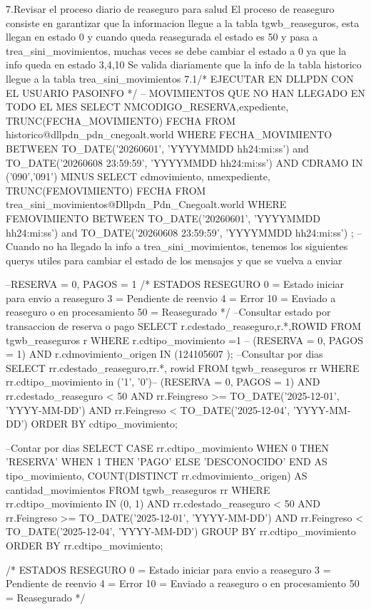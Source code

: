 7.Revisar el proceso diario de reaseguro para salud
El proceso de reaseguro consiste en garantizar que la informacion llegue a la tabla tgwb_reaseguros, esta llegan en estado 0 y cuando queda reasegurada el estado es 50 y pasa a trea_sini_movimientos, muchas veces se debe cambiar el estado a 0 ya que la info queda en estado 3,4,10
Se valida diariamente que la info de la tabla historico llegue a la tabla trea_sini_movimientos
7.1/* EJECUTAR EN DLLPDN CON EL USUARIO PASOINFO */
-- MOVIMIENTOS QUE NO HAN LLEGADO EN TODO EL MES
SELECT NMCODIGO_RESERVA,expediente, TRUNC(FECHA_MOVIMIENTO) FECHA
  FROM historico@dllpdn_pdn_cnegoalt.world
 WHERE FECHA_MOVIMIENTO  BETWEEN TO_DATE('20260601', 'YYYYMMDD hh24:mi:ss') and TO_DATE('20260608 23:59:59', 'YYYYMMDD hh24:mi:ss')
 AND CDRAMO IN ('090','091')
 MINUS 
SELECT cdmovimiento, nmexpediente, TRUNC(FEMOVIMIENTO) FECHA
  FROM trea_sini_movimientos@Dllpdn_Pdn_Cnegoalt.world
 WHERE FEMOVIMIENTO  BETWEEN TO_DATE('20260601', 'YYYYMMDD hh24:mi:ss') and TO_DATE('20260608 23:59:59', 'YYYYMMDD hh24:mi:ss')
;
--Cuando no ha llegado la info a trea_sini_movimientos, tenemos los siguientes querys utiles para cambiar el estado de los mensajes y que se vuelva a enviar 

--RESERVA = 0, PAGOS = 1
/*
ESTADOS RESEGURO
0 = Estado iniciar para envio a reaseguro
3 = Pendiente de reenvio
4 = Error
10 = Enviado a reaseguro o en procesamiento
50 = Reasegurado
*/
--Consultar estado por transaccion de reserva o pago
SELECT r.cdestado_reaseguro,r.*,ROWID
FROM   tgwb_reaseguros r
WHERE  r.cdtipo_movimiento =1 -- (RESERVA = 0, PAGOS = 1)
AND    r.cdmovimiento_origen IN (124105607
);
--Consultar por dias
SELECT rr.cdestado_reaseguro,rr.*, rowid
FROM tgwb_reaseguros rr
WHERE rr.cdtipo_movimiento  in ('1', '0')-- (RESERVA = 0, PAGOS = 1)
  AND rr.cdestado_reaseguro < 50
  AND rr.Feingreso >= TO_DATE('2025-12-01', 'YYYY-MM-DD')
  AND rr.Feingreso < TO_DATE('2025-12-04', 'YYYY-MM-DD')
  ORDER BY cdtipo_movimiento;
  
--Contar por dias  
SELECT
  CASE rr.cdtipo_movimiento
    WHEN 0 THEN 'RESERVA'
    WHEN 1 THEN 'PAGO'
    ELSE 'DESCONOCIDO'
  END AS tipo_movimiento,
  COUNT(DISTINCT rr.cdmovimiento_origen) AS cantidad_movimientos
FROM tgwb_reaseguros rr
WHERE
  rr.cdtipo_movimiento IN (0, 1)
  AND rr.cdestado_reaseguro < 50
  AND rr.Feingreso >= TO_DATE('2025-12-01', 'YYYY-MM-DD')
  AND rr.Feingreso < TO_DATE('2025-12-04', 'YYYY-MM-DD')
GROUP BY rr.cdtipo_movimiento
ORDER BY rr.cdtipo_movimiento;
  
/*
ESTADOS RESEGURO
0 = Estado iniciar para envio a reaseguro
3 = Pendiente de reenvio
4 = Error
10 = Enviado a reaseguro o en procesamiento
50 = Reasegurado
*/

